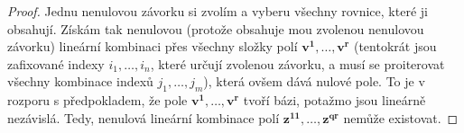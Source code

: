 \documentclass[a5paper,12pt]{amsbook}
\theoremstyle{definition}
\newcommand{\myvec}[1]{\mathbf{#1}}
\begin{document}
\begin{proof}
Jednu nenulovou závorku si zvolím a vyberu všechny rovnice, které ji obsahují. Získám tak nenulovou (protože obsahuje mou zvolenou
nenulovou závorku) lineární kombinaci přes všechny složky polí $\myvec{v^1},\hdots,\myvec{v^r}$ (tentokrát jsou zafixované indexy
$i_1,\hdots,i_n$, které určují zvolenou závorku, a musí se proiterovat všechny kombinace indexů $j_1,\hdots,j_m$), která ovšem dává
nulové pole. To je v rozporu s předpokladem, že pole $\myvec{v^1},\hdots,\myvec{v^r}$ tvoří bázi, potažmo jsou lineárně nezávislá.
Tedy, nenulová lineární kombinace polí $\myvec{z^{11}},\hdots,\myvec{z^{qr}}$ nemůže existovat.

\end{proof}
\end{document}
